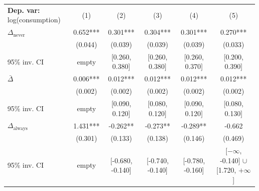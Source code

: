 \begin{tabular}{l ccccc} \toprule  \textbf{Dep. var:}  log(consumption) 
                    &\multicolumn{1}{c}{(1)}   &\multicolumn{1}{c}{(2)}   &\multicolumn{1}{c}{(3)}   &\multicolumn{1}{c}{(4)}   &\multicolumn{1}{c}{(5)}   \\

\addlinespace
$\Delta_{\text{never}}$&       0.652***&       0.301***&       0.304***&       0.301***&       0.270***\\
                    &     (0.044)   &     (0.039)   &     (0.039)   &     (0.039)   &     (0.033)   \\
95\% inv. CI        &       empty   &[0.260, 0.380]   &[0.260, 0.380]   &[0.260, 0.370]   &[0.200, 0.390]   \\

\addlinespace
$\bar{\Delta}$      &       0.006***&       0.012***&       0.012***&       0.012***&       0.012***\\
                    &     (0.002)   &     (0.002)   &     (0.002)   &     (0.002)   &     (0.002)   \\
95\% inv. CI        &       empty   &[0.090, 0.120]   &[0.080, 0.120]   &[0.090, 0.120]   &[0.080, 0.130]   \\

\addlinespace
$\Delta_{\text{always}}$&       1.431***&      -0.262** &      -0.273** &      -0.289** &      -0.662   \\
                    &     (0.301)   &     (0.133)   &     (0.138)   &     (0.146)   &     (0.469)   \\
95\% inv. CI        &       empty   &[-0.680, -0.140]   &[-0.740, -0.140]   &[-0.780, -0.160]   &[$-\infty$, -0.140] $\cup$ [1.720, $+\infty$]   \\


\end{tabular}
